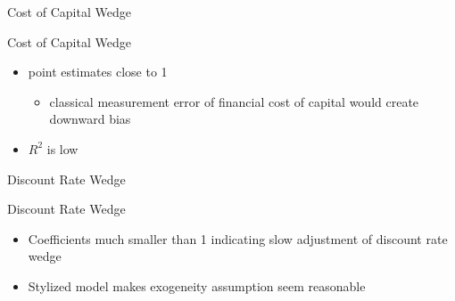 \documentclass[aspectratio=169]{beamer}
\begin{document}

\begin{frame}{Cost of Capital Wedge}
\end{frame}

\begin{frame}{Cost of Capital Wedge}
    

\begin{itemize}
    \item point estimates close to 1
    \begin{itemize}
        \item classical measurement error of financial cost of capital would create downward bias
    \end{itemize}
    \item $R^2$ is low
\end{itemize}
\end{frame}

\begin{frame}{Discount Rate Wedge}
\end{frame}

\begin{frame}{Discount Rate Wedge}
    
    \begin{itemize}
        \item Coefficients much smaller than 1 indicating slow adjustment of discount rate wedge
        \item Stylized model makes exogeneity assumption seem reasonable
    \end{itemize}
\end{frame}
\end{document}
